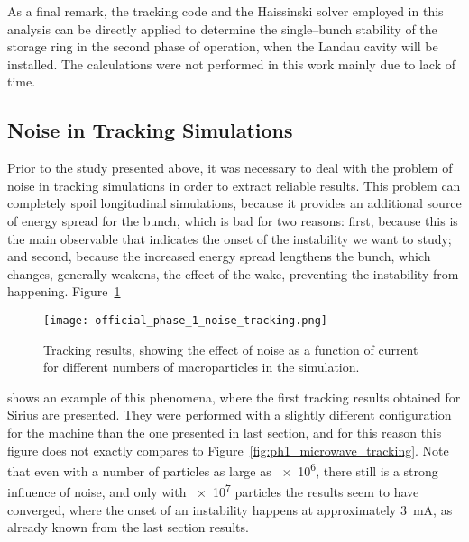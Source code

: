     As a final remark, the tracking code and the Haissinski solver employed in this analysis can be directly applied to determine the single--bunch stability of the storage ring in the second phase of operation, when the Landau cavity will be installed. The calculations were not performed in this work mainly due to lack of time.

\subsection{Noise in Tracking Simulations}\label{ssec:noise}

    Prior to the study presented above, it was necessary to deal with the problem of noise in tracking simulations in order to extract reliable results. This problem can completely spoil longitudinal simulations, because it provides an additional source of energy spread for the bunch, which is bad for two reasons: first, because this is the main observable that indicates the onset of the instability we want to study; and second, because the increased energy spread lengthens the bunch, which changes, generally weakens, the effect of the wake, preventing the instability from happening. Figure~\ref{fig:first_tracking}
    \begin{figure}
        \centering
        \texttt{[image: official\_phase\_1\_noise\_tracking.png]}
        \caption{Tracking results, showing the effect of noise as a function of current for different numbers of macroparticles in the simulation.}
        \label{fig:first_tracking}
    \end{figure}
    shows an example of this phenomena, where the first tracking results obtained for Sirius are presented. They were performed with a slightly different configuration for the machine than the one presented in last section, and for this reason this figure does not exactly compares to Figure~\ref{fig:ph1_microwave_tracking}. Note that even with a number of particles as large as \num{e6}, there still is a strong influence of noise, and only with \num{e7} particles the results seem to have converged, where the onset of an instability happens at approximately \SI{3}{\milli\ampere}, as already known from the last section results.

